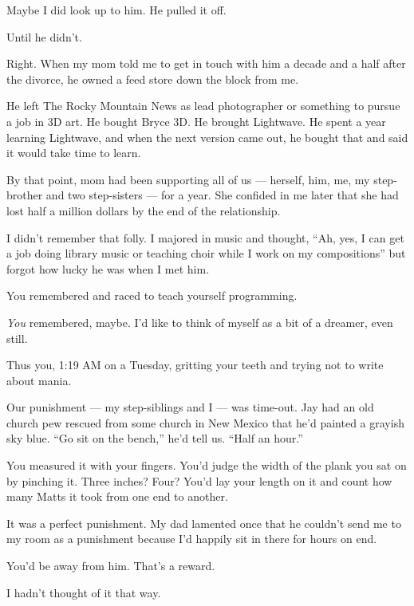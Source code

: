 Maybe I did look up to him. He pulled it off.

\begin{ally}
Until he didn't.
\end{ally}
Right. When my mom told me to get in touch with him a decade and a half after the divorce, he owned a feed store down the block from me.

He left The Rocky Mountain News as lead photographer or something to pursue a job in 3D art. He bought Bryce 3D. He brought Lightwave. He spent a year learning Lightwave, and when the next version came out, he bought that and said it would take time to learn.

By that point, mom had been supporting all of us --- herself, him, me, my step-brother and two step-sisters --- for a year. She confided in me later that she had lost half a million dollars by the end of the relationship.

I didn't remember that folly. I majored in music and thought, ``Ah, yes, I can get a job doing library music or teaching choir while I work on my compositions'' but forgot how lucky he was when I met him.

\begin{ally}
You remembered and raced to teach yourself programming.
\end{ally}
\emph{You} remembered, maybe. I'd like to think of myself as a bit of a dreamer, even still.

\begin{ally}
Thus you, 1:19 AM on a Tuesday, gritting your teeth and trying not to write about mania.
\end{ally}
\newpage

\noindent Our punishment --- my step-siblings and I --- was time-out. Jay had an old church pew rescued from some church in New Mexico that he'd painted a grayish sky blue. ``Go sit on the bench,'' he'd tell us. ``Half an hour.''

\begin{ally}
You measured it with your fingers. You'd judge the width of the plank you sat on by pinching it. Three inches? Four? You'd lay your length on it and count how many Matts it took from one end to another.
\end{ally}
It was a perfect punishment. My dad lamented once that he couldn't send me to my room as a punishment because I'd happily sit in there for hours on end.

\begin{ally}
You'd be away from him. That's a reward.
\end{ally}
I hadn't thought of it that way.

